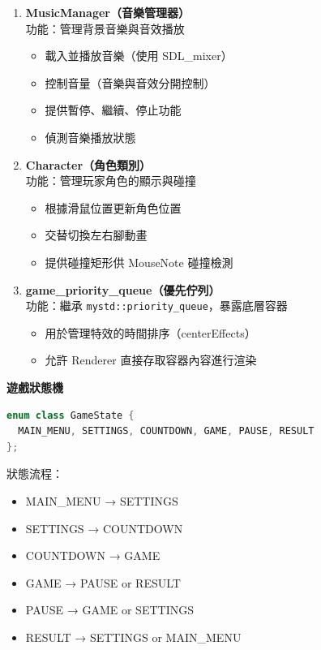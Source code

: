 \documentclass[a4paper,12pt]{article}
\begin{document}
\begin{enumerate}
  輸出格式範例：
\begin{lstlisting}
&bpm=120
&offset=0
&fragments=4
&keynotes=
1, 2, 3, 4
&mousenotes=
G1, R2, G3
\end{lstlisting}
  \item \textbf{MusicManager（音樂管理器）} \\
  功能：管理背景音樂與音效播放
  \begin{itemize}
    \item 載入並播放音樂（使用 SDL\_mixer）
    \item 控制音量（音樂與音效分開控制）
    \item 提供暫停、繼續、停止功能
    \item 偵測音樂播放狀態
  \end{itemize}
  \item \textbf{Character（角色類別）} \\
  功能：管理玩家角色的顯示與碰撞
  \begin{itemize}
    \item 根據滑鼠位置更新角色位置
    \item 交替切換左右腳動畫
    \item 提供碰撞矩形供 MouseNote 碰撞檢測
  \end{itemize}
  \item \textbf{game\_priority\_queue（優先佇列）} \\
  功能：繼承 \verb|mystd::priority_queue|，暴露底層容器
  \begin{itemize}
    \item 用於管理特效的時間排序（centerEffects）
    \item 允許 Renderer 直接存取容器內容進行渲染
  \end{itemize}
\end{enumerate}
\textbf{遊戲狀態機}
\begin{lstlisting}[language=C++]
enum class GameState {
  MAIN_MENU, SETTINGS, COUNTDOWN, GAME, PAUSE, RESULT
};
\end{lstlisting}
狀態流程：
\begin{itemize}
  \item MAIN\_MENU → SETTINGS
  \item SETTINGS → COUNTDOWN
  \item COUNTDOWN → GAME
  \item GAME → PAUSE or RESULT
  \item PAUSE → GAME or SETTINGS
  \item RESULT → SETTINGS or MAIN\_MENU
\end{itemize}
\end{document}
